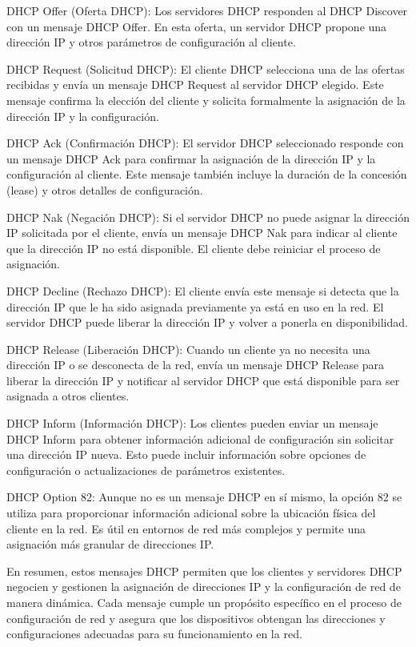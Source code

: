 	DHCP Offer (Oferta DHCP): Los servidores DHCP responden al DHCP Discover con un mensaje DHCP Offer. En esta oferta, un servidor DHCP propone una dirección IP y otros parámetros de configuración al cliente.
	
	DHCP Request (Solicitud DHCP): El cliente DHCP selecciona una de las ofertas recibidas y envía un mensaje DHCP Request al servidor DHCP elegido. Este mensaje confirma la elección del cliente y solicita formalmente la asignación de la dirección IP y la configuración.
	
	DHCP Ack (Confirmación DHCP): El servidor DHCP seleccionado responde con un mensaje DHCP Ack para confirmar la asignación de la dirección IP y la configuración al cliente. Este mensaje también incluye la duración de la concesión (lease) y otros detalles de configuración.
	
	DHCP Nak (Negación DHCP): Si el servidor DHCP no puede asignar la dirección IP solicitada por el cliente, envía un mensaje DHCP Nak para indicar al cliente que la dirección IP no está disponible. El cliente debe reiniciar el proceso de asignación.
	
	DHCP Decline (Rechazo DHCP): El cliente envía este mensaje si detecta que la dirección IP que le ha sido asignada previamente ya está en uso en la red. El servidor DHCP puede liberar la dirección IP y volver a ponerla en disponibilidad.
	
	DHCP Release (Liberación DHCP): Cuando un cliente ya no necesita una dirección IP o se desconecta de la red, envía un mensaje DHCP Release para liberar la dirección IP y notificar al servidor DHCP que está disponible para ser asignada a otros clientes.
	
	DHCP Inform (Información DHCP): Los clientes pueden enviar un mensaje DHCP Inform para obtener información adicional de configuración sin solicitar una dirección IP nueva. Esto puede incluir información sobre opciones de configuración o actualizaciones de parámetros existentes.
	
	DHCP Option 82: Aunque no es un mensaje DHCP en sí mismo, la opción 82 se utiliza para proporcionar información adicional sobre la ubicación física del cliente en la red. Es útil en entornos de red más complejos y permite una asignación más granular de direcciones IP.
	
	En resumen, estos mensajes DHCP permiten que los clientes y servidores DHCP negocien y gestionen la asignación de direcciones IP y la configuración de red de manera dinámica. Cada mensaje cumple un propósito específico en el proceso de configuración de red y asegura que los dispositivos obtengan las direcciones y configuraciones adecuadas para su funcionamiento en la red.